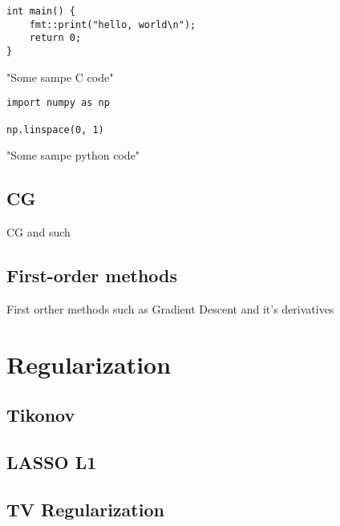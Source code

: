 
\begin{listing}
	\begin{verbatim}
int main() {
    fmt::print("hello, world\n");
    return 0;
}
    \end{verbatim}
	\caption{"Some sampe C code"}
\end{listing}
\begin{listing}
	\begin{verbatim}
import numpy as np

np.linspace(0, 1)
    \end{verbatim}
	\caption{"Some sampe python code"}
\end{listing}


\subsection{CG}\label{subsec:conjuage_gradient}

CG and such

\subsection{First-order methods}\label{subsec:first_order_methods}

First orther methods such as Gradient Descent and it's derivatives

\section{Regularization}\label{sec:regularization}

\subsection{Tikonov}\label{subsec:tikhonov_regularization}

\subsection{LASSO L1}\label{subsec:l1_regularization}

\subsection{TV Regularization}\label{subsec:tv_regularization}
